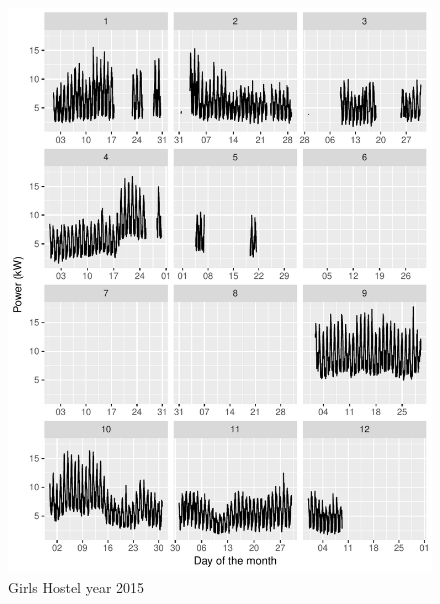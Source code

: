 \documentclass[11pt, oneside]{article}   	%
\begin{document}
\begin{figure}
\includegraphics[keepaspectratio]{girls_hostel_year2015.pdf}
\caption{Girls Hostel year 2015}
\end{figure}
\end{document}
